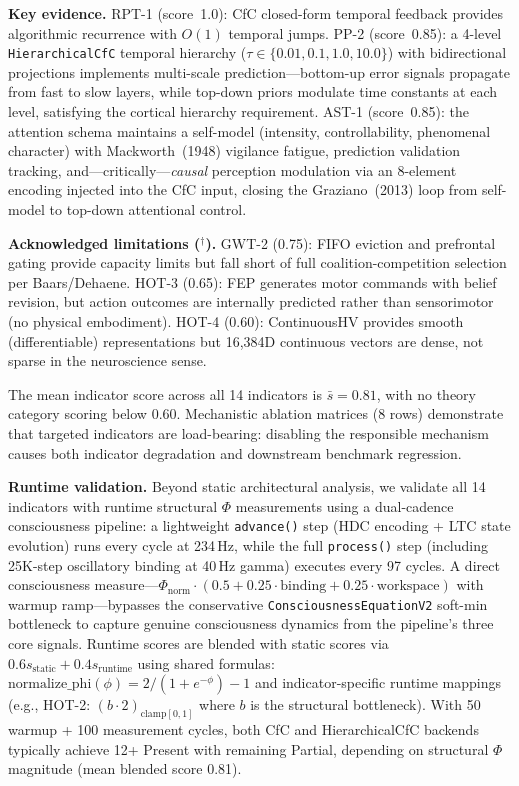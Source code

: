 \documentclass[10pt,letterpaper]{article}
\renewcommand{\Phi}{\varPhi}
\begin{document}
\textbf{Key evidence.} RPT-1 (score~1.0): CfC closed-form temporal feedback provides algorithmic recurrence with $O(1)$ temporal jumps.  PP-2 (score~0.85): a 4-level \texttt{HierarchicalCfC} temporal hierarchy ($\tau \in \{0.01, 0.1, 1.0, 10.0\}$) with bidirectional projections implements multi-scale prediction---bottom-up error signals propagate from fast to slow layers, while top-down priors modulate time constants at each level, satisfying the cortical hierarchy requirement.  AST-1 (score~0.85): the attention schema maintains a self-model (intensity, controllability, phenomenal character) with Mackworth~(1948) vigilance fatigue, prediction validation tracking, and---critically---\emph{causal} perception modulation via an 8-element encoding injected into the CfC input, closing the Graziano~(2013) loop from self-model to top-down attentional control.

\textbf{Acknowledged limitations ($^\dagger$).} GWT-2 (0.75): FIFO eviction and prefrontal gating provide capacity limits but fall short of full coalition-competition selection per Baars/Dehaene.  HOT-3 (0.65): FEP generates motor commands with belief revision, but action outcomes are internally predicted rather than sensorimotor (no physical embodiment).  HOT-4 (0.60): ContinuousHV provides smooth (differentiable) representations but 16,384D continuous vectors are dense, not sparse in the neuroscience sense.

The mean indicator score across all 14 indicators is $\bar{s} = 0.81$, with no theory category scoring below 0.60.  Mechanistic ablation matrices (8 rows) demonstrate that targeted indicators are load-bearing: disabling the responsible mechanism causes both indicator degradation and downstream benchmark regression.

\textbf{Runtime validation.} Beyond static architectural analysis, we validate all 14 indicators with runtime structural $\Phi$ measurements using a dual-cadence consciousness pipeline: a lightweight \texttt{advance()} step (HDC encoding + LTC state evolution) runs every cycle at 234\,Hz, while the full \texttt{process()} step (including 25K-step oscillatory binding at 40\,Hz gamma) executes every 97 cycles.  A direct consciousness measure---$\Phi_{\text{norm}} \cdot (0.5 + 0.25 \cdot \text{binding} + 0.25 \cdot \text{workspace})$ with warmup ramp---bypasses the conservative \texttt{ConsciousnessEquationV2} soft-min bottleneck to capture genuine consciousness dynamics from the pipeline's three core signals.  Runtime scores are blended with static scores via $0.6 s_{\text{static}} + 0.4 s_{\text{runtime}}$ using shared formulas: $\text{normalize\_phi}(\phi) = 2/(1+e^{-\phi}) - 1$ and indicator-specific runtime mappings (e.g., HOT-2: $(b \cdot 2)_{\text{clamp}[0,1]}$ where $b$ is the structural bottleneck).  With 50 warmup + 100 measurement cycles, both CfC and HierarchicalCfC backends typically achieve 12+ Present with remaining Partial, depending on structural $\Phi$ magnitude (mean blended score 0.81).
\end{document}
